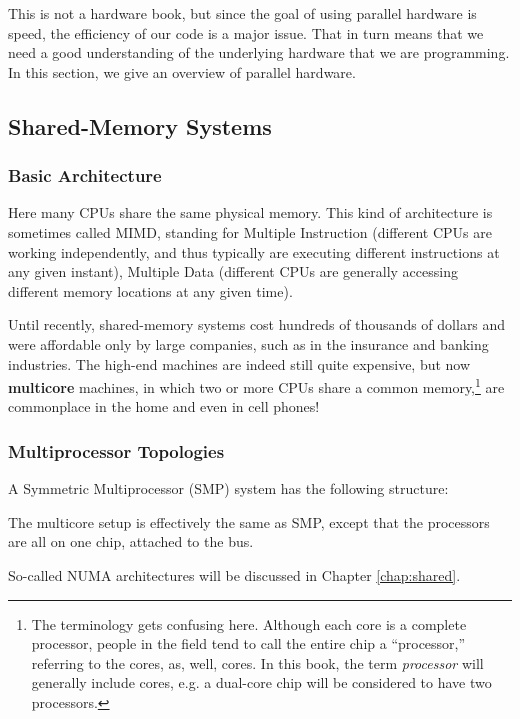 This is not a hardware book, but since the goal of using parallel
hardware is speed, the efficiency of our code is a major issue.  That in
turn means that we need a good understanding of the underlying hardware
that we are programming.  In this section, we give an overview of
parallel hardware.

\subsection{Shared-Memory Systems}

\subsubsection{Basic Architecture}

Here many CPUs share the same physical memory.  This kind of
architecture is sometimes called MIMD, standing for Multiple Instruction
(different CPUs are working independently, and thus typically are
executing different instructions at any given instant), Multiple Data
(different CPUs are generally accessing different memory locations at
any given time).

Until recently, shared-memory systems cost hundreds of thousands of
dollars and were affordable only by large companies, such as in the
insurance and banking industries.  The high-end machines are indeed
still quite expensive, but now {\bf multicore} machines, in which two or
more CPUs share a common memory,\footnote{The terminology gets confusing
here.  Although each core is a complete processor, people in the field
tend to call the entire chip a ``processor,'' referring to the cores,
as, well, cores.  In this book, the term {\it processor} will generally
include cores, e.g. a dual-core chip will be considered to have two
processors.} are commonplace in the home and even in cell phones!

\subsubsection{Multiprocessor Topologies}

A Symmetric Multiprocessor (SMP) system has the following structure:



The multicore setup is effectively the same as SMP, except that the
processors are all on one chip, attached to the bus.

So-called NUMA architectures will be discussed in Chapter
\ref{chap:shared}.

